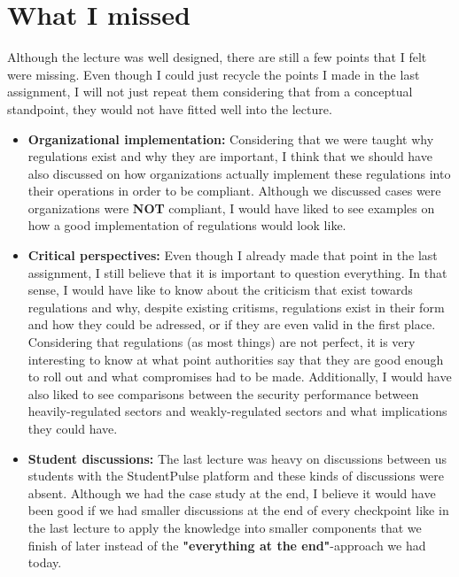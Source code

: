 \documentclass[12pt]{article}
\begin{document}
\section{What I missed}
Although the lecture was well designed, there are still a few points that I felt were missing. Even though I could just recycle the points I made in the last assignment, I will not just repeat them considering that from a conceptual standpoint, they would not have fitted well into the lecture.
\begin{itemize}
\item \textbf{Organizational implementation:} Considering that we were taught why regulations exist and why they are important, I think that we should have also discussed on how organizations actually implement these regulations into their operations in order to be compliant. Although we discussed cases were organizations were \textbf{NOT} compliant, I would have liked to see examples on how a good implementation of regulations would look like.
\item \textbf{Critical perspectives:} Even though I already made that point in the last assignment, I still believe that it is important to question everything. In that sense, I would have like to know about the criticism that exist towards regulations and why, despite existing critisms, regulations exist in their form and how they could be adressed, or if they are even valid in the first place. Considering that regulations (as most things) are not perfect, it is very interesting to know at what point authorities say that they are good enough to roll out and what compromises had to be made. Additionally, I would have also liked to see comparisons between the security performance between heavily-regulated sectors and weakly-regulated sectors and what implications they could have.
\item \textbf{Student discussions:} The last lecture was heavy on discussions between us students with the StudentPulse platform and these kinds of discussions were absent. Although we had the case study at the end, I believe it would have been good if we had smaller discussions at the end of every checkpoint like in the last lecture to apply the knowledge into smaller components that we finish of later instead of the \textbf{"everything at the end"}-approach we had today.
\end{itemize}
\end{document}
